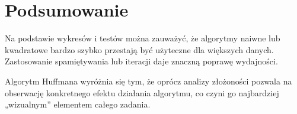 \documentclass[a4paper,12pt]{article}
\begin{document}
\section{Podsumowanie}

Na podstawie wykresów i testów można zauważyć, że algorytmy naiwne lub
kwadratowe bardzo szybko przestają być użyteczne dla większych danych.
Zastosowanie spamiętywania lub iteracji daje
znaczną poprawę wydajności.

Algorytm Huffmana wyróżnia się tym, że oprócz analizy złożoności pozwala
na obserwację konkretnego efektu działania algorytmu, co czyni go
najbardziej „wizualnym” elementem całego zadania.
\end{document}
